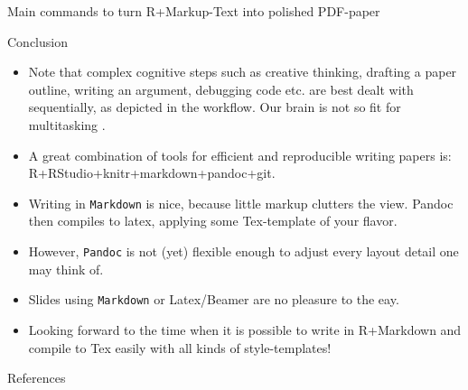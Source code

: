 \documentclass[final,hyperref={pdfpagelabels=false}]{beamer}
\begin{document}
\begin{frame}{}
\begin{columns}[t]
\begin{column}{.48\linewidth}
\begin{block}{Main commands to turn R+Markup-Text into polished PDF-paper}
        \end{block}
        
        
        
        \begin{block}{Conclusion}
            \begin{itemize}
            \item Note that complex cognitive steps such as creative thinking, drafting a paper outline, writing an argument, debugging code etc. are best dealt with sequentially, as depicted in the workflow. Our brain is not so fit for multitasking \cite{Clapp2011}.
             \item A great combination of tools for efficient and reproducible writing papers is: R+RStudio+knitr+markdown+pandoc+git.    
             \item Writing in \texttt{Markdown} is nice, because little markup clutters the view. Pandoc then compiles to latex, applying some Tex-template of your flavor.
             \item However,  \texttt{Pandoc} is not (yet) flexible enough to adjust every layout detail one may think of. 
             \item Slides using \texttt{Markdown} or {Latex/Beamer} are no pleasure to the eay.
             \item Looking forward to the time when it is possible to write in R+Markdown and compile to Tex easily with all kinds of style-templates!
                \end{itemize}
        \end{block}     



     \begin{block}{References}
     \begin{tiny}
   
     
     
     \end{tiny}
     \end{block}     
   
   
         \end{column}
    \end{columns}
  \end{frame}
\end{document}
